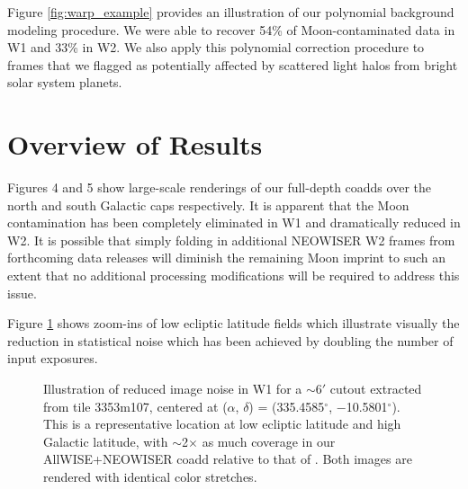 \documentclass{emulateapj}
\begin{document}
Figure \ref{fig:warp_example} provides an illustration of our polynomial 
background modeling procedure. We were able to recover 54\% of 
Moon-contaminated data in W1 and 33\% in W2. We also apply this polynomial
correction procedure to frames that we flagged as potentially affected
by scattered light halos from bright solar system planets.


\begin{figure*}
 \begin{center}
  \caption{\label{fig:warp_example} Illustration of the procedure by which
           we recover Moon-contaminated exposures, as described in 
           $\S$\ref{sec:recover}. Shown here is quadrant 2
           of W1 exposure 05245b140. This quadrant was successfully recovered.}
 \end{center}
\end{figure*}

\section{Overview of Results}
\label{sec:results}

Figures 4 and 5 show large-scale renderings of our full-depth coadds 
over the north and south Galactic caps respectively. It is 
apparent that the Moon contamination has been completely eliminated in
W1 and dramatically reduced in W2. It is possible that simply folding in 
additional NEOWISER W2 frames from forthcoming data releases will diminish the 
remaining Moon imprint to such an extent that no additional processing 
modifications will be required to address this issue.

Figure \ref{fig:image_noise} shows zoom-ins of low ecliptic latitude fields 
which illustrate visually the reduction in statistical noise which has been 
achieved by doubling the number of input exposures.


\begin{figure}
 \begin{center}
  \caption{\label{fig:image_noise} Illustration of reduced image noise
           in W1 for a $\sim$6$'$ cutout extracted from tile 3353m107, centered
           at ($\alpha$, $\delta$) = (335.4585$^{\circ}$, $-$10.5801$^{\circ}$). 
           This is a representative location at low ecliptic latitude and high 
           Galactic latitude,  with $\sim$2$\times$ as much coverage in our 
           AllWISE+NEOWISER coadd relative to that of \cite{lang14}. Both
           images are rendered with identical color stretches.}
 \end{center}
\end{figure}
\end{document}
